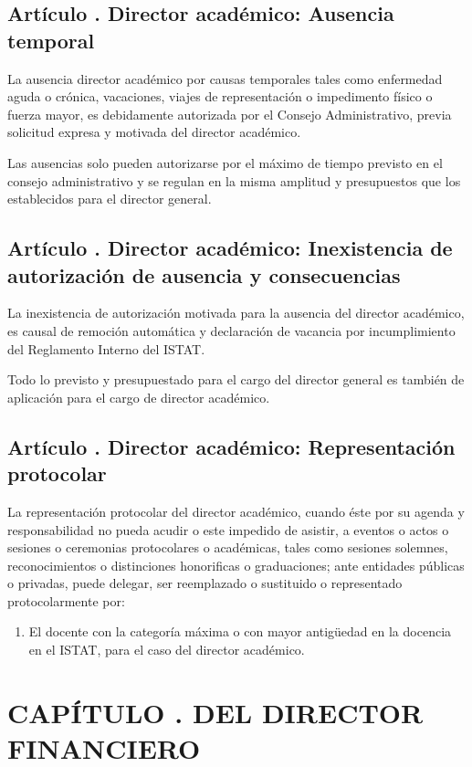 \subsection{Artículo . Director académico: Ausencia temporal}
\addtocounter{ns}{1}
La ausencia director académico por causas temporales tales como enfermedad aguda o crónica, vacaciones, viajes de representación o impedimento físico o fuerza mayor, es debidamente autorizada por el Consejo Administrativo, previa solicitud expresa y motivada del director académico. 

Las ausencias solo pueden autorizarse por el máximo de tiempo previsto en el consejo administrativo y se regulan en la misma amplitud y presupuestos que los establecidos para el director general. 
\subsection{Artículo . Director académico: Inexistencia de autorización de ausencia y consecuencias}
\addtocounter{ns}{1}
La inexistencia de autorización motivada para la ausencia del director académico, es causal de remoción automática y declaración de vacancia por incumplimiento del Reglamento Interno del ISTAT. 

Todo lo previsto y presupuestado para el cargo del director general es también de aplicación para el cargo de director académico. 
\subsection{Artículo . Director académico: Representación protocolar}
\addtocounter{ns}{1}
La representación protocolar del director académico, cuando éste por su agenda y responsabilidad no pueda acudir o este impedido de asistir, a eventos o actos o sesiones o ceremonias protocolares o académicas, tales como sesiones solemnes, reconocimientos o distinciones honorificas o graduaciones; ante entidades públicas o privadas, puede delegar, ser reemplazado o sustituido o representado protocolarmente por:  
\begin{enumerate}
\item El docente con la categoría máxima o con mayor antigüedad en la docencia en el ISTAT, para el caso del director académico. 
\end{enumerate}
\section{CAPÍTULO . DEL DIRECTOR FINANCIERO}
\addtocounter{re}{1}
